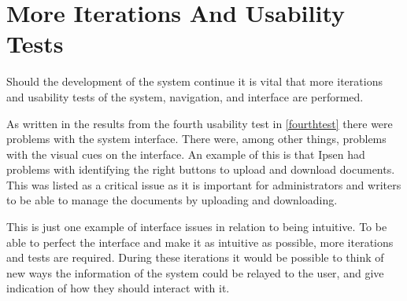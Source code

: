 \documentclass[../../master.tex]{subfiles}
\begin{document}
\section{More Iterations And Usability Tests}

Should the development of the system continue it is vital that more iterations and usability tests of the system, navigation, and interface are performed.

As written in the results from the fourth usability test in \cref{fourthtest} there were problems with the system interface.
There were, among other things, problems with the visual cues on the interface.
An example of this is that Ipsen had problems with identifying the right buttons to upload and download documents.
This was listed as a critical issue as it is important for administrators and writers to be able to manage the documents by uploading and downloading.

This is just one example of interface issues in relation to being intuitive.
To be able to perfect the interface and make it as intuitive as possible, more iterations and tests are required.
During these iterations it would be possible to think of new ways the information of the system could be relayed to the user, and give indication of how they should interact with it.
\end{document}
